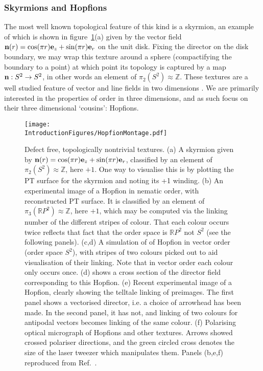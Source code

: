 \subsubsection{Skyrmions and Hopfions}
\label{subsec:SkyrmionsAndHopfions}
The most well known topological feature of this kind is a skyrmion, an example of which is shown in figure~\ref{fig:HopfionMontage}(a) given by the vector field ${\bf n}(r) = \cos(\pi r) {\bf e}_z + \sin(\pi r) {\bf e}_r$ on the unit disk. Fixing the director on the disk boundary, we may wrap this texture around a sphere (compactifying the boundary to a point) at which point its topology is captured by a map ${\bf n} : S^2 \rightarrow S^2$, in other words an element of $\pi_2 (S^2)\approx \mathbb{Z}$. These textures are a well studied feature of vector and line fields in two dimensions \citep{AlexanderBook}. We are primarily interested in the properties of order in three dimensions, and as such focus on their three dimensional `cousins': Hopfions.
\begin{figure}[htbp]
\centering
\texttt{[image: \\IntroductionFigures/HopfionMontage.pdf]}
\caption{Defect free, topologically nontrivial textures. (a) A skyrmion given by ${\bf n}(r) = \cos(\pi r) {\bf e}_z + \sin(\pi r) {\bf e}_r$, classified by an element of $\pi_2(S^2)\approx \mathbb{Z}$, here $+1$. One way to visualise this is by plotting the PT surface for the skyrmion and noting its +1 winding. (b) An experimental image of a Hopfion in nematic order, with reconstructed PT surface. It is classified by an element of $\pi_3(\mathbb{R}P^2)\approx \mathbb{Z}$, here $+1$, which may be computed via the linking number of the different stripes of colour. That each colour occurs twice reflects that fact that the order space is $\mathbb{R}P^2$ not $S^2$ (see the following panels). (c,d) A simulation of of Hopfion in vector order (order space $S^2$), with stripes of two colours picked out to aid visualisation of their linking. Note that in vector order each colour only occurs once. (d) shows a cross section of the director field corresponding to this Hopfion. (e) Recent experimental image of a Hopfion, clearly showing the telltale linking of preimages. The first panel shows a vectorised director, i.e. a choice of arrowhead has been made. In the second panel, it has not, and linking of two colours for antipodal vectors becomes linking of the same colour. (f) Polarising optical micrograph of Hopfions and other textures. Arrows showed crossed polariser directions, and the green circled cross denotes the size of the laser tweezer which manipulates them. Panels (b,e,f) reproduced from Ref.~\citep{Chen2013,Ackerman2017}.}
\label{fig:HopfionMontage}
\end{figure}
